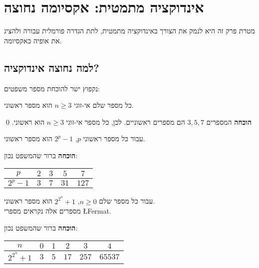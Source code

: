 
\chapter{%
אינדוקציה מתמטית: אקסיומה נחוצה%
}\label{s.axiom}

מטרת פרק זה היא לנמק את הצורך באינדוקציה מתמטית, לתת הגדרה פורמלית עבורה ולהציג את אופיה כאקסיומה.

\section{%
למה נחוצה אינדוקציה?
}\label{s.why}

נקפוץ ישר להוכחת מספר משפטים:

\begin{theorem}\label{t.odd}
כל מספר שלם אי-זוגי
$n\geq 3$
הוא מספר ראשוני.
\end{theorem}

\textbf{הוכחה}
המספרים
$3,5,7$
הם מספרים ראשוניים. לכן, כל מספר אי-זוגי
$n\geq 3$
הוא ראשוני.
\qed

\begin{theorem}\label{t.odd-prime}
עבור כל מספר ראשוני
$p$, $2^p-1$
הוא מספר ראשוני.
\end{theorem}

\textbf{הוכחה} 
ברור שהמשפט נכון:
\begin{center}
\begin{tabular}{|c|c|c|c|c|}
\hline
$p$ & $2$ & $3$ & $5$ & $7$ \\\hline
$2^p-1$ & $3$ & $7$ & $31$ & $127$ \\\hline
\end{tabular}
\end{center}


\begin{theorem}\label{t.fermat}
עבור כל מספר שלם
$n\geq 0$, $2^{2^{n}}+1$
הוא מספר ראשוני.\\
מספרים אלה נקראים מספרי
\L{Fermat}.
\end{theorem}
\vspace*{-2ex}
\textbf{הוכחה} 
ברור שהמשפט נכון:
\begin{center}
\renewcommand{\arraystretch}{1.3}
\begin{tabular}{|c|c|c|c|c|c|}
\hline
$n$ & $0$ & $1$ & $2$ & $3$ & $4$ \\\hline
$2^{2^{n}}+1$ & $3$ & $5$ & $17$ & $257$ & $65537$ \\\hline
\end{tabular}
\end{center}

